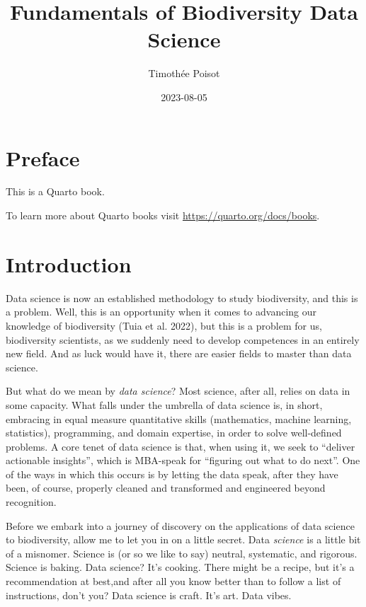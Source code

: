 \documentclass[
  letterpaper,
]{scrbook}
\title{Fundamentals of Biodiversity Data Science}
\author{Timothée Poisot}
\date{2023-08-05}
\renewcommand*\contentsname{Table of contents}
\newcommand\contentsname{Table of contents}
\begin{document}
\frontmatter
\maketitle
\renewcommand*\contentsname{Table of contents}
{
\setcounter{tocdepth}{1}
\tableofcontents
}
\mainmatter
{}

\hypertarget{preface}{%
\chapter*{Preface}\label{preface}}


This is a Quarto book.

To learn more about Quarto books visit
\url{https://quarto.org/docs/books}.


\hypertarget{introduction}{%
\chapter{Introduction}\label{introduction}}

Data science is now an established methodology to study biodiversity,
and this is a problem. Well, this is an opportunity when it comes to
advancing our knowledge of biodiversity (Tuia et al. 2022), but this is
a problem for us, biodiversity scientists, as we suddenly need to
develop competences in an entirely new field. And as luck would have it,
there are easier fields to master than data science.

But what do we mean by \emph{data science}? Most science, after all,
relies on data in some capacity. What falls under the umbrella of data
science is, in short, embracing in equal measure quantitative skills
(mathematics, machine learning, statistics), programming, and domain
expertise, in order to solve well-defined problems. A core tenet of data
science is that, when using it, we seek to ``deliver actionable
insights'', which is MBA-speak for ``figuring out what to do next''. One
of the ways in which this occurs is by letting the data speak, after
they have been, of course, properly cleaned and transformed and
engineered beyond recognition.

Before we embark into a journey of discovery on the applications of data
science to biodiversity, allow me to let you in on a little secret. Data
\emph{science} is a little bit of a misnomer. Science is (or so we like
to say) neutral, systematic, and rigorous. Science is baking. Data
science? It's cooking. There might be a recipe, but it's a
recommendation at best,and after all you know better than to follow a
list of instructions, don't you? Data science is craft. It's art. Data
vibes.
\end{document}
